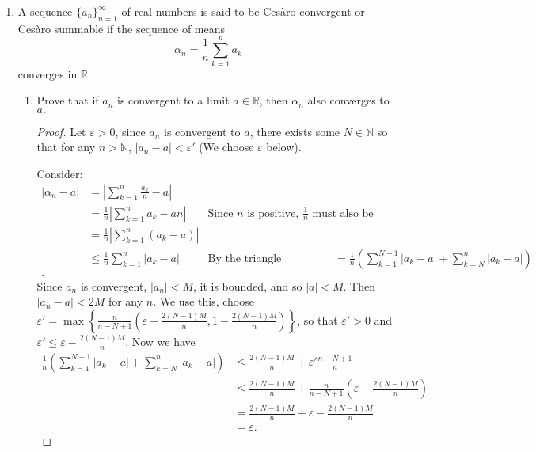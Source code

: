 \documentclass{article}
\begin{document}
\begin{enumerate} 

\item A sequence $\{a_n\}_{n=1}^{\infty}$ of real numbers is said to be Cesàro convergent or Cesàro summable
if the sequence of means
\[\alpha_n=\frac{1}{n}\sum_{k=1}^na_k\]
converges in $\mathbb{R}.$

\begin{enumerate}
    \item Prove that if $a_n$ is convergent to a limit $a\in \mathbb{R}$, then $\alpha _n$ also converges to $a.$ 
        \begin{proof} 
            Let $\varepsilon>0$, since $a_n$ is convergent to $a$, there exists some $N\in \mathbb{N}$ so that for any $n>\mathbb{N}$, $|a_n-a|<\varepsilon'$ 
            (We choose $\varepsilon$ below).

            Consider: 
            \begin{align*}
                |\alpha_n-a|&=\left|\sum_{k=1}^{n} \frac{a_k}{n} -a\right| \\
                            &= \frac{1}{n}\left| \sum_{k=1}^{n} a_k -an \right| &\text{Since $n$ is positive, $\frac{1}{n}$ must also be} \\
                            &= \frac{1}{n}\left| \sum_{k=1}^{n} (a_k -a) \right| \\
                            &\leq \frac{1}{n}\sum_{k=1}^{n} \left| a_k-a \right| &\text{By the triangle inequality}
                            &= \frac{1}{n}\left( \sum_{k=1}^{N-1} |a_k-a| +\sum_{k=N}^{n} |a_k-a|\right)  \\
            .\end{align*}
            Since $a_n$ is convergent, $|a_n|<M$, it is bounded, and so $|a|<M$. Then $|a_n-a|<2M$ for any $n$.
            We use this, choose $\varepsilon'=\max \left\{\frac{n}{n-N+1}\left( \varepsilon- \frac{2(N-1)M}{n}, 1-\frac{2(N-1)M}{n} \right)\right\}$,
            so that $\varepsilon'>0$ and $\varepsilon'\leq\varepsilon- \frac{2(N-1)M}{n}$. Now we have
            \begin{align*}
                            \frac{1}{n}\left( \sum_{k=1}^{N-1} |a_k-a| +\sum_{k=N}^{n} |a_k-a|\right) &\leq \frac{2(N-1)M}{n}+\varepsilon' \frac{n-N+1}{n}  \\
                            &\leq \frac{2(N-1)M}{n}+ \frac{n}{n-N+1}\left( \varepsilon- \frac{2(N-1)M}{n} \right)\\
                            &= \frac{2(N-1)M}{n}+ \varepsilon- \frac{2(N-1)M}{n}\\
                            &= \varepsilon
            .\end{align*}
            

\end{proof}
\end{enumerate}
\end{enumerate}
\end{document}
